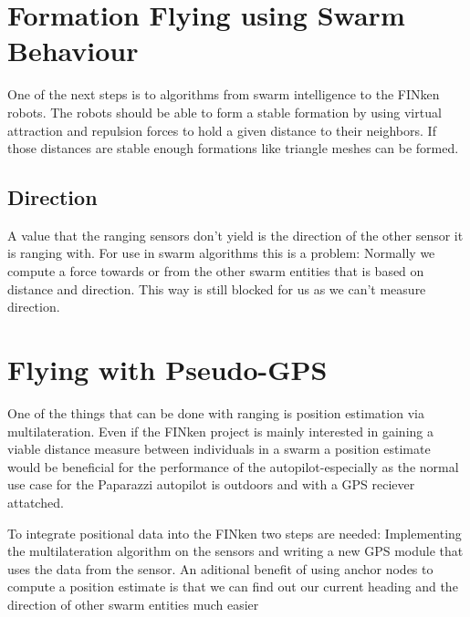 \section{Formation Flying using Swarm Behaviour}
One of the next steps is to  algorithms from swarm intelligence to the FINken robots.
The robots should be able to form a stable formation by using virtual attraction and repulsion forces to hold a given distance to their neighbors.
If those distances are stable enough formations like triangle meshes can be formed.

\subsection{Direction}
A value that the ranging sensors don't yield is the direction of the other sensor it is ranging with.
For use in swarm algorithms this is a problem: Normally we compute a force towards or from the other swarm entities that is based on distance and direction.
This way is still blocked for us as we can't measure direction.


\section{Flying with Pseudo-GPS}
One of the things that can be done with ranging is position estimation via multilateration.
Even if the FINken project is mainly interested in gaining a viable distance measure between individuals in a swarm a position estimate would be beneficial for the performance of the autopilot-especially as the normal use case for the Paparazzi autopilot is outdoors and with a GPS reciever attatched.

To integrate positional data into the FINken two steps are needed: Implementing the multilateration algorithm on the sensors and writing a new GPS module that uses the data from the sensor.
An aditional benefit of using anchor nodes to compute a position estimate is that we can find out our current heading and the direction of other swarm entities much easier
